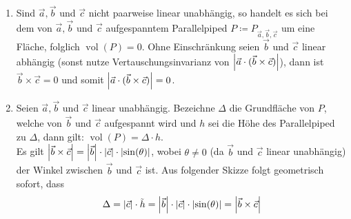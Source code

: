 \documentclass{theozettel}
\newcommand{\vol}{\operatorname{vol}}
\begin{document}
\begin{enumerate}[(F1)]
	\item 	Sind $\vec{a},\vec{b}$ und $\vec{c}$ nicht paarweise linear unabhängig, so handelt es sich bei dem von $\vec{a}, \vec{b}$ und $\vec{c}$ aufgespanntem Parallelpiped $P \coloneqq P_{\vec{a},\vec{b},\vec{c}}$ um eine Fläche, folglich $\vol(P) = 0$. Ohne Einschränkung seien $\vec{b}$ und $\vec{c}$ linear abhängig (sonst nutze Vertauschungsinvarianz von $\qty|\vec{a} \cdot (\vec{b} \times \vec{c})|$), dann ist $\vec{b} \times \vec{c} = 0$ und somit $\qty|\vec{a} \cdot (\vec{b} \times \vec{c})| = 0$.
	
	\item 	Seien $\vec{a}, \vec{b}$ und $\vec{c}$ linear unabhängig. Bezeichne $\Delta$ die Grundfläche von $P$, welche von $\vec{b}$ und $\vec{c}$ aufgespannt wird und $h$ sei die Höhe des Parallelpiped zu $\Delta$, dann gilt: $\vol(P) = \Delta \cdot h$. \\
			Es gilt $\qty|\vec{b} \times \vec{c}| = \qty|\vec{b}| \cdot \qty|\vec{c}| \cdot \qty|\sin(\theta)|$, wobei $\theta \neq 0$ (da $\vec{b}$ und $\vec{c}$ linear unabhängig) der Winkel zwischen $\vec{b}$ und $\vec{c}$ ist. Aus folgender Skizze folgt geometrisch sofort, dass \[\Delta = \qty|\vec{c}| \cdot \tilde{h} = \qty|\vec{b}| \cdot \qty|\vec{c}| \cdot \qty|\sin(\theta)| = \qty|\vec{b} \times \vec{c}| \]
			\begin{figure}[h]
			\centering
\end{figure}
\end{enumerate}
\end{document}
